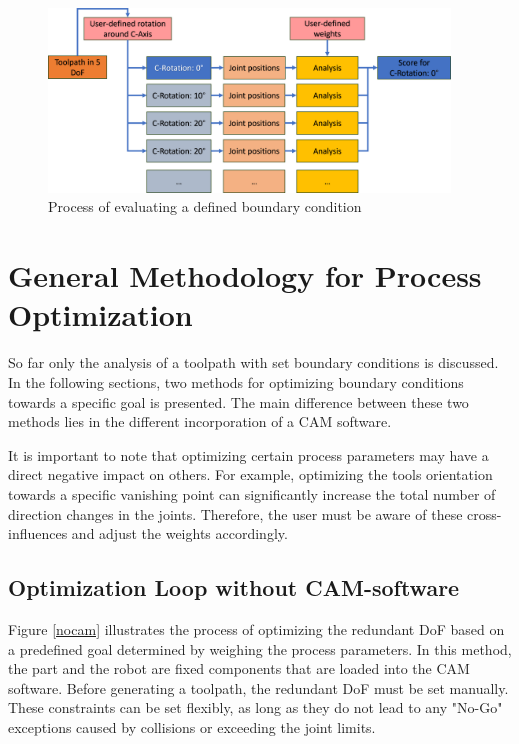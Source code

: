 \begin{figure}[H]
	\centerline{\includegraphics[width=0.95\textwidth]{figures/grob.png}}
	\caption{Process of evaluating a defined boundary condition}
	\label{grob}
\end{figure}
















\newpage
\section{General Methodology for Process Optimization}
So far only the analysis of a toolpath with set boundary conditions is discussed. In the following sections, two methods for optimizing boundary conditions towards a specific goal is presented. The main difference between these two methods lies in the different incorporation of a CAM software.

It is important to note that optimizing certain process parameters may have a direct negative impact on others. For example, optimizing the tools orientation towards a specific vanishing point can significantly increase the total number of direction changes in the joints. Therefore, the user must be aware of these cross-influences and adjust the weights accordingly.

\subsection{Optimization Loop without CAM-software}\label{nocamchap}

Figure \ref{nocam} illustrates the process of optimizing the redundant DoF based on a predefined goal determined by weighing the process parameters. In this method, the part and the robot are fixed components that are loaded into the CAM software. Before generating a toolpath, the redundant DoF must be set manually. These constraints can be set flexibly, as long as they do not lead to any "No-Go" exceptions caused by collisions or exceeding the joint limits.

